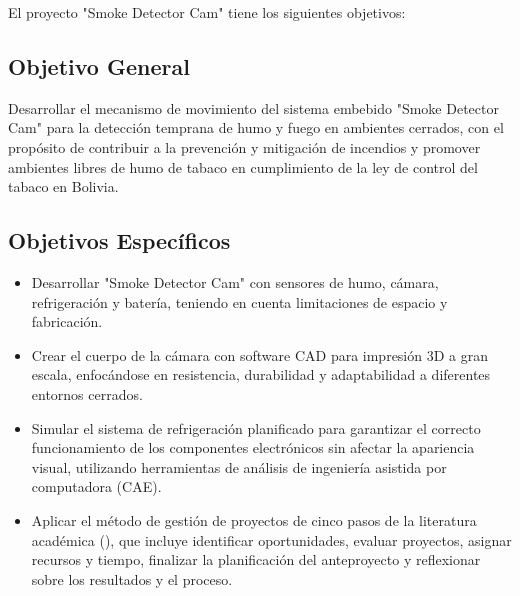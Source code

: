 El proyecto "Smoke Detector Cam" tiene los siguientes objetivos:

\subsection{Objetivo General}
Desarrollar el mecanismo de movimiento del sistema embebido "Smoke Detector Cam" para la detección temprana de humo y fuego en ambientes cerrados, con el propósito de contribuir a la prevención y mitigación de incendios y promover ambientes libres de humo de tabaco en cumplimiento de la ley de control del tabaco en Bolivia.

\needspace{3cm}
\subsection{Objetivos Específicos}
\begin{itemize}
\item Desarrollar "Smoke Detector Cam" con sensores de humo, cámara, refrigeración y batería, teniendo en cuenta limitaciones de espacio y fabricación.
\item Crear el cuerpo de la cámara con software CAD para impresión 3D a gran escala, enfocándose en resistencia, durabilidad y adaptabilidad a diferentes entornos cerrados.
\item Simular el sistema de refrigeración planificado para garantizar el correcto funcionamiento de los componentes electrónicos sin afectar la apariencia visual, utilizando herramientas de análisis de ingeniería asistida por computadora (CAE).
\needspace{4cm}
\item Aplicar el método de gestión de proyectos de cinco pasos de la literatura académica (\cite{Ulrich2012}), que incluye identificar oportunidades, evaluar proyectos, asignar recursos y tiempo, finalizar la planificación del anteproyecto y reflexionar sobre los resultados y el proceso.
\end{itemize}